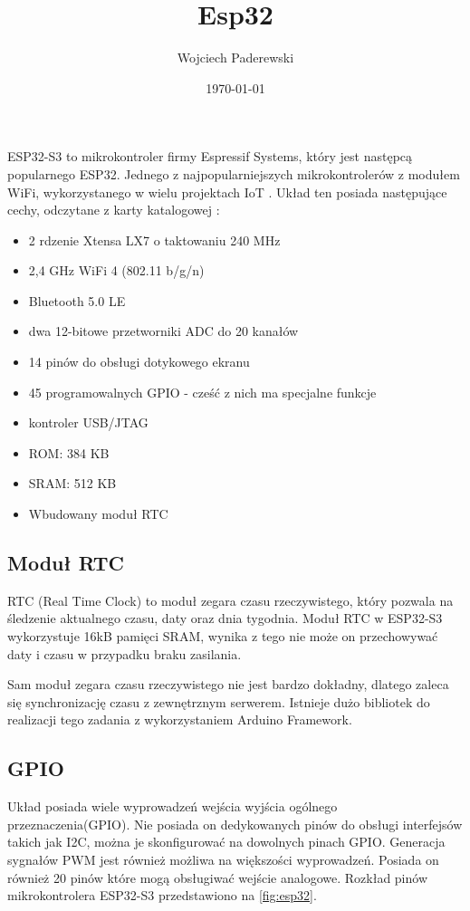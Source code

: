 \documentclass[../main.tex]{subfiles}
\author{Wojciech Paderewski}
\date{\today}
\title{Esp32}
\begin{document}
ESP32-S3 to mikrokontroler firmy Espressif Systems, który jest następcą popularnego ESP32.
Jednego z najpopularniejszych mikrokontrolerów z modułem WiFi, wykorzystanego w wielu projektach IoT \cite{st:esp32-book}.
Układ ten posiada następujące cechy, odczytane z karty katalogowej \cite{st:esp32}:

\begin{itemize}
\item 2 rdzenie Xtensa LX7 o taktowaniu 240 MHz
\item 2,4 GHz WiFi 4 (802.11 b/g/n)
\item Bluetooth 5.0 LE
\item dwa 12-bitowe przetworniki ADC do 20 kanałów
\item 14 pinów do obsługi dotykowego ekranu
\item 45 programowalnych GPIO - cześć z nich ma specjalne funkcje
\item kontroler USB/JTAG
\item ROM: 384 KB
\item SRAM: 512 KB
\item Wbudowany moduł RTC
\end{itemize}
\subsection{Moduł RTC}

RTC (Real Time Clock) to moduł zegara czasu rzeczywistego, który pozwala na śledzenie aktualnego czasu, daty oraz dnia tygodnia.
Moduł RTC w ESP32-S3 wykorzystuje 16kB pamięci SRAM, wynika z tego nie może on przechowywać daty i czasu w przypadku braku zasilania.

Sam moduł zegara czasu rzeczywistego nie jest bardzo dokładny, 
dlatego zaleca się synchronizację czasu z zewnętrznym serwerem.
Istnieje dużo bibliotek do realizacji tego zadania z wykorzystaniem Arduino Framework.
\subsection{GPIO}
Układ posiada wiele wyprowadzeń wejścia wyjścia ogólnego przeznaczenia(GPIO). Nie posiada on dedykowanych pinów do obsługi interfejsów takich jak I2C, można 
je skonfigurować na dowolnych pinach GPIO. Generacja sygnałów PWM jest również możliwa na większości wyprowadzeń. Posiada on również 20 pinów które mogą
obsługiwać wejście analogowe. Rozkład pinów mikrokontrolera ESP32-S3 przedstawiono na \ref{fig:esp32}.
\end{document}
